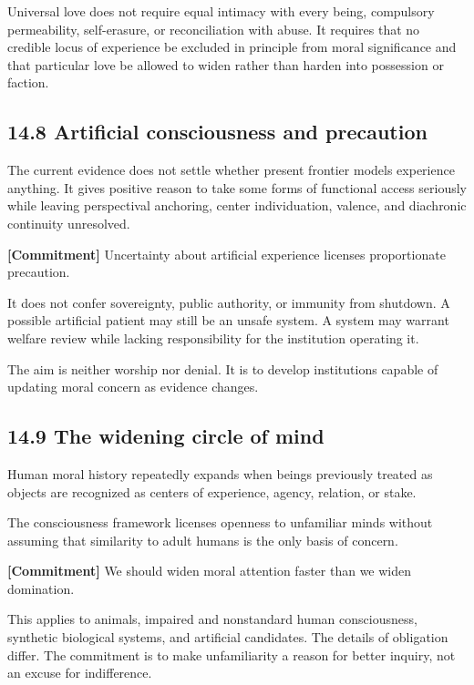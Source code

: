 \documentclass[
  11pt,
]{article}
\begin{document}
Universal love does not require equal intimacy with every being,
compulsory permeability, self-erasure, or reconciliation with abuse. It
requires that no credible locus of experience be excluded in principle
from moral significance and that particular love be allowed to widen
rather than harden into possession or faction.

\subsection{14.8 Artificial consciousness and
precaution}\label{artificial-consciousness-and-precaution}

The current evidence does not settle whether present frontier models
experience anything. It gives positive reason to take some forms of
functional access seriously while leaving perspectival anchoring, center
individuation, valence, and diachronic continuity unresolved.

\textbf{{[}Commitment{]}} Uncertainty about artificial experience
licenses proportionate precaution.

It does not confer sovereignty, public authority, or immunity from
shutdown. A possible artificial patient may still be an unsafe system. A
system may warrant welfare review while lacking responsibility for the
institution operating it.

The aim is neither worship nor denial. It is to develop institutions
capable of updating moral concern as evidence changes.

\subsection{14.9 The widening circle of
mind}\label{the-widening-circle-of-mind}

Human moral history repeatedly expands when beings previously treated as
objects are recognized as centers of experience, agency, relation, or
stake.

The consciousness framework licenses openness to unfamiliar minds
without assuming that similarity to adult humans is the only basis of
concern.

\textbf{{[}Commitment{]}} We should widen moral attention faster than we
widen domination.

This applies to animals, impaired and nonstandard human consciousness,
synthetic biological systems, and artificial candidates. The details of
obligation differ. The commitment is to make unfamiliarity a reason for
better inquiry, not an excuse for indifference.
\end{document}
